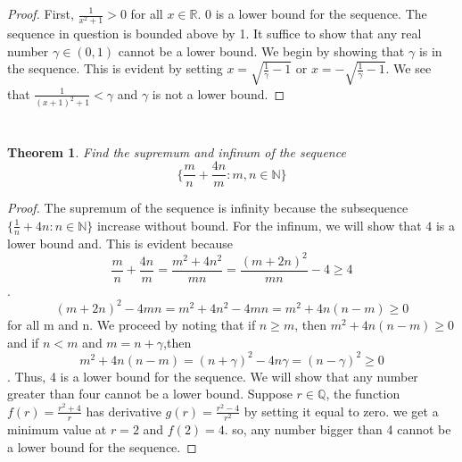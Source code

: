 \documentclass{article}
\theoremstyle{plain}
\newtheorem{theorem}{Theorem}
\theoremstyle{definition}
\begin{document}
\begin{proof}
First, $\frac{1}{x^2 + 1} > 0$ for all $x \in \mathbb{R}$. 0 is a lower bound for the sequence. The sequence in question is bounded above by 1. It suffice to show that any real number $\gamma \in (0,1)$ cannot be a lower bound. We begin by showing that $\gamma$ is in the sequence. This is evident by setting $x =  \sqrt{\frac{1}{\gamma} - 1}$ or $x = -\sqrt{\frac{1}{\gamma} - 1}$. We see that $\frac{1}{(x + 1)^2 + 1} < \gamma$ and $\gamma$ is not a lower bound.
\end{proof}

\section{}
\begin{theorem}
Find the supremum and infinum of the sequence $$\{\frac{m}{n} + \frac{4n}{m}: m,n \in \mathbb{N} \} $$ 
\end{theorem}

\begin{proof}
The supremum of the sequence is infinity because the subsequence $\{\frac{1}{n} + 4n: n \in \mathbb{N} \}$ increase without bound. For the infinum, we will show that $4$ is a lower bound and. This is evident because $$\frac{m}{n} + \frac{4n}{m} = \frac{m^2 + 4n^2}{mn} = \frac{(m + 2n)^2}{mn} - 4 \geq 4 $$ . $$(m + 2n)^2 - 4mn = m^2 + 4n^2 - 4mn  = m^2 + 4n(n - m) \geq 0$$ for all m and n. We proceed by noting that if $n \geq m$, then $m^2 + 4n(n - m) \geq 0$ and if $ n < m$ and  $m = n + \gamma$,then  $$ m^2 + 4n(n - m) = (n + \gamma)^2 - 4n\gamma = (n - \gamma)^2 \geq 0$$. Thus, 4 is a lower bound for the sequence. We will show that any number greater than four cannot be a lower bound. 
Suppose $r \in \mathbb{Q}$, the function $f(r) = \frac{r^2 + 4}{r}$ has derivative $g(r) = \frac{r^2 - 4}{r^2}$ by setting it equal to zero. we get a minimum value at $r = 2$ and $f(2) = 4$. so, any number bigger than 4 cannot be a lower bound for the sequence.
\end{proof}
\end{document}
